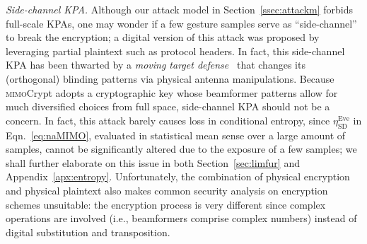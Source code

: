 \documentclass[conference,compsoc]{IEEEtran}
\newcommand{\name}{\textsc{mimo}Crypt\xspace}
\newcommand{\needrev}[1]{{\color{green}#1}} %
\newcommand{\needrev}[1]{#1}
\begin{document}
{\emph{Side-channel KPA.}
%
Although our attack model in Section~\ref{ssec:attackm} forbids full-scale KPAs, one may wonder if a few gesture samples serve as ``side-channel'' to break the encryption; a digital version of this attack was proposed by~\cite{KPA-NDSS14} leveraging partial plaintext such as protocol headers. In fact, this side-channel KPA has been thwarted by a \textit{moving target defense}~\cite{Robin} that changes its (orthogonal) blinding patterns via physical antenna manipulations.
Because \name adopts a cryptographic key whose beamformer patterns allow for much diversified choices from full space,
side-channel KPA should not be a concern. In fact, this attack barely causes loss in conditional entropy, since $\eta_{\mathrm{SD}}^{\mathrm{Eve}}$ in Eqn.~\eqref{eq:naMIMO}, evaluated in statistical mean sense over a large amount of samples, cannot be significantly altered due to the exposure of a few samples; 
%
we shall further elaborate on this issue in both Section~\ref{sec:limfur} and Appendix~\ref{apx:entropy}.
%
Unfortunately, the combination of physical encryption and physical plaintext also makes common security analysis on encryption schemes unsuitable: 
the encryption process is very different since complex operations are involved (i.e., beamformers comprise complex numbers) instead of digital substitution and transposition.
}
\end{document}
